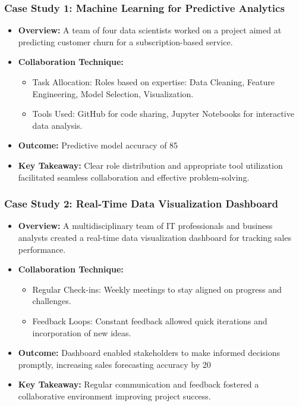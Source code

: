 \documentclass[aspectratio=169]{beamer}
\begin{document}
\begin{frame}[fragile]
    \frametitle{Case Study 1: Machine Learning for Predictive Analytics}
    \begin{itemize}
        \item \textbf{Overview:}
        A team of four data scientists worked on a project aimed at predicting customer churn for a subscription-based service.
        
        \item \textbf{Collaboration Technique:}
        \begin{itemize}
            \item Task Allocation: Roles based on expertise: Data Cleaning, Feature Engineering, Model Selection, Visualization.
            \item Tools Used: GitHub for code sharing, Jupyter Notebooks for interactive data analysis.
        \end{itemize}

        \item \textbf{Outcome:}
        Predictive model accuracy of 85%

        \item \textbf{Key Takeaway:}
        Clear role distribution and appropriate tool utilization facilitated seamless collaboration and effective problem-solving.
    \end{itemize}
\end{frame}

\begin{frame}[fragile]
    \frametitle{Case Study 2: Real-Time Data Visualization Dashboard}
    \begin{itemize}
        \item \textbf{Overview:}
        A multidisciplinary team of IT professionals and business analysts created a real-time data visualization dashboard for tracking sales performance.

        \item \textbf{Collaboration Technique:}
        \begin{itemize}
            \item Regular Check-ins: Weekly meetings to stay aligned on progress and challenges.
            \item Feedback Loops: Constant feedback allowed quick iterations and incorporation of new ideas.
        \end{itemize}

        \item \textbf{Outcome:}
        Dashboard enabled stakeholders to make informed decisions promptly, increasing sales forecasting accuracy by 20%

        \item \textbf{Key Takeaway:}
        Regular communication and feedback fostered a collaborative environment improving project success.
    \end{itemize}
\end{frame}
\end{document}
